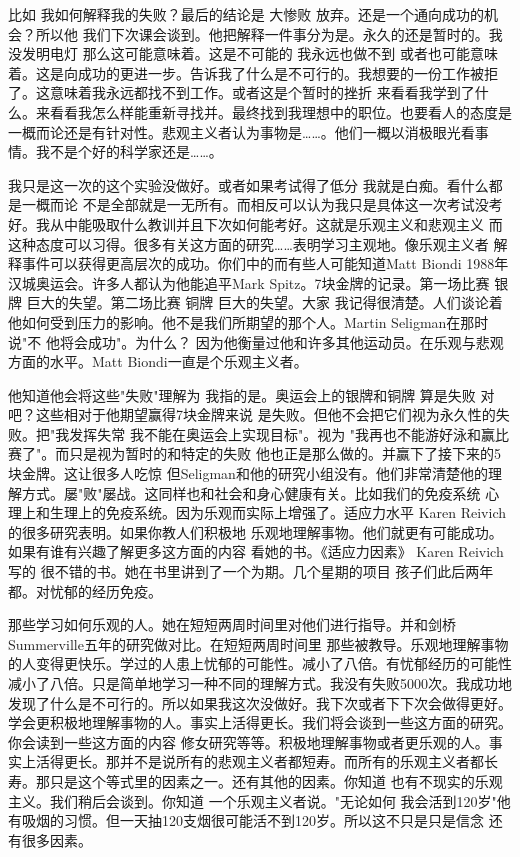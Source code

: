 比如 我如何解释我的失败？最后的结论是 大惨败 放弃。还是一个通向成功的机会？所以他 我们下次课会谈到。他把解释一件事分为是。永久的还是暂时的。我没发明电灯 那么这可能意味着。这是不可能的 我永远也做不到 或者也可能意味着。这是向成功的更进一步。告诉我了什么是不可行的。我想要的一份工作被拒了。这意味着我永远都找不到工作。或者这是个暂时的挫折 来看看我学到了什么。来看看我怎么样能重新寻找并。最终找到我理想中的职位。也要看人的态度是一概而论还是有针对性。悲观主义者认为事物是……。他们一概以消极眼光看事情。我不是个好的科学家还是……。 

我只是这一次的这个实验没做好。或者如果考试得了低分 我就是白痴。看什么都是一概而论 不是全部就是一无所有。而相反可以认为我只是具体这一次考试没考好。我从中能吸取什么教训并且下次如何能考好。这就是乐观主义和悲观主义 而这种态度可以习得。很多有关这方面的研究……表明学习主观地。像乐观主义者 解释事件可以获得更高层次的成功。你们中的而有些人可能知道Matt Biondi 1988年汉城奥运会。许多人都认为他能追平Mark Spitz。7块金牌的记录。第一场比赛 银牌 巨大的失望。第二场比赛 铜牌 巨大的失望。大家 我记得很清楚。人们谈论着他如何受到压力的影响。他不是我们所期望的那个人。Martin Seligman在那时说"不 他将会成功"。为什么？ 因为他衡量过他和许多其他运动员。在乐观与悲观方面的水平。Matt Biondi一直是个乐观主义者。 

他知道他会将这些"失败"理解为 我指的是。奥运会上的银牌和铜牌 算是失败 对吧？这些相对于他期望赢得7块金牌来说 是失败。但他不会把它们视为永久性的失败。把"我发挥失常 我不能在奥运会上实现目标"。视为 "我再也不能游好泳和赢比赛了"。而只是视为暂时的和特定的失败 他也正是那么做的。并赢下了接下来的5块金牌。这让很多人吃惊 但Seligman和他的研究小组没有。他们非常清楚他的理解方式。屡"败"屡战。这同样也和社会和身心健康有关。比如我们的免疫系统 心理上和生理上的免疫系统。因为乐观而实际上增强了。适应力水平 Karen Reivich的很多研究表明。如果你教人们积极地 乐观地理解事物。他们就更有可能成功。如果有谁有兴趣了解更多这方面的内容 看她的书。《适应力因素》 Karen Reivich写的 很不错的书。她在书里讲到了一个为期。几个星期的项目 孩子们此后两年都。对忧郁的经历免疫。 

那些学习如何乐观的人。她在短短两周时间里对他们进行指导。并和剑桥Summerville五年的研究做对比。在短短两周时间里 那些被教导。乐观地理解事物的人变得更快乐。学过的人患上忧郁的可能性。减小了八倍。有忧郁经历的可能性减小了八倍。只是简单地学习一种不同的理解方式。我没有失败5000次。我成功地发现了什么是不可行的。所以如果我这次没做好。我下次或者下下次会做得更好。学会更积极地理解事物的人。事实上活得更长。我们将会谈到一些这方面的研究。你会读到一些这方面的内容 修女研究等等。积极地理解事物或者更乐观的人。事实上活得更长。那并不是说所有的悲观主义者都短寿。而所有的乐观主义者都长寿。那只是这个等式里的因素之一。还有其他的因素。你知道 也有不现实的乐观主义。我们稍后会谈到。你知道 一个乐观主义者说。"无论如何 我会活到120岁"他有吸烟的习惯。但一天抽120支烟很可能活不到120岁。所以这不只是只是信念 还有很多因素。 

